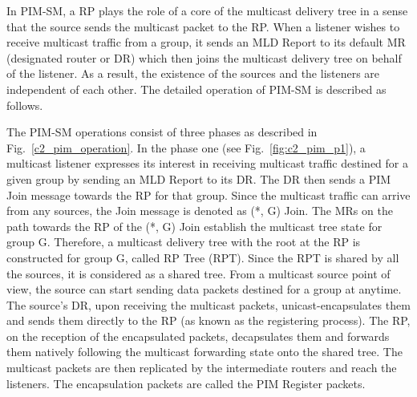 In PIM-SM, a RP plays the role of a core of the multicast delivery tree in a sense that the source sends the multicast packet to the RP. When a listener wishes to receive multicast traffic from a group, it sends an MLD Report to its default MR (designated router or DR) which then joins the multicast delivery tree on behalf of the listener. As a result, the existence of the sources and the listeners are independent of each other. The detailed operation of PIM-SM is described as follows.

The PIM-SM operations consist of three phases as described in Fig.~\ref{c2_pim_operation}. In the phase one (see Fig.~\ref{fig:c2_pim_p1}), a multicast listener expresses its interest in receiving multicast traffic  destined for a given group by sending an MLD Report to its DR. The DR then sends a PIM Join message towards the RP for that group. Since the multicast traffic can arrive from any sources, the Join message is denoted as (*, G) Join. The MRs on the path towards the RP of the (*, G) Join establish the multicast tree state for group G. Therefore, a multicast delivery tree with the root at the RP is constructed for group G, called RP Tree (RPT). Since the RPT is shared by all the sources, it is considered as a shared tree. From a multicast source point of view, the source can start sending data packets destined for a group at anytime. The source's DR, upon receiving the multicast packets, unicast-encapsulates them and sends them directly to the RP (as known as the registering process). The RP, on the reception of the encapsulated packets, decapsulates them and forwards them natively following the multicast forwarding state onto the shared tree. The multicast packets are then replicated by the intermediate routers and reach the listeners. The encapsulation packets are called the PIM Register packets. 
